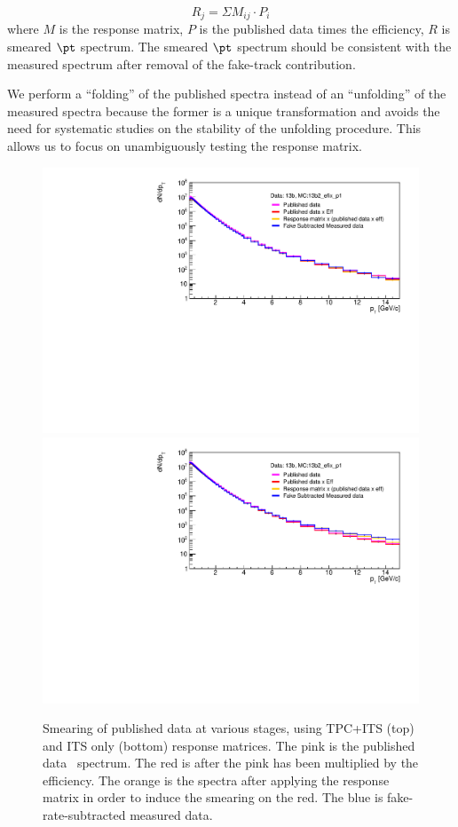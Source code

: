 \begin{equation}\label{eq:refold_eq}
R_{j} = \Sigma M_{ij} \cdot P_{i}
\end{equation}
where $M$ is the response matrix, $P$ is the published data times the efficiency, $R$ is smeared $\pt$ spectrum. The smeared $\pt$ spectrum should be consistent with the measured spectrum after removal of the fake-track contribution.

We perform a ``folding'' of the published spectra instead of an ``unfolding'' of the measured spectra because the former is a unique transformation and avoids the need for systematic studies on the stability of the unfolding procedure. This allows us to focus on unambiguously testing the response matrix. 

\begin{figure}[h]
\centering
\includegraphics[width=.95\textwidth]{Data_Analysis/Tracking/refolding_pPb_tpc_MBMC_0GeV15GeV_dNdpt.pdf}
\includegraphics[width=.95\textwidth]{Data_Analysis/Tracking/refolding_pPb_its_MBMC_0GeV15GeV_dNdpt.pdf}
\caption{Smearing of published data at various stages, using TPC+ITS (top) and ITS only (bottom) response matrices. The pink is the published data \pt~spectrum. The red is after the pink has been multiplied by the efficiency. The orange is the spectra after applying the response matrix in order to induce the smearing on the red. The blue is fake-rate-subtracted measured data.}
\label{fig:RefoldedComparisonSpectra}
\end{figure}

